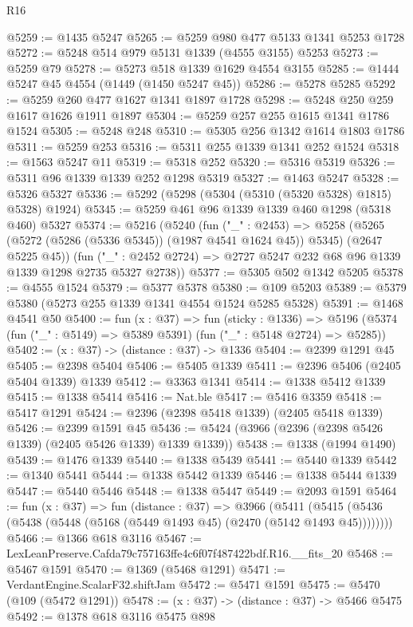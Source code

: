 \begin{lexlean}{R16}
\begin{coremodule}
@5259 := @1435 @5247
@5265 := @5259 @980 @477 @5133 @1341 @5253 @1728
@5272 := @5248 @514 @979 @5131 @1339 (@4555 @3155) @5253
@5273 := @5259 @79
@5278 := @5273 @518 @1339 @1629 @4554 @3155
@5285 := @1444 @5247 @45 @4554 (@1449 (@1450 @5247 @45))
@5286 := @5278 @5285
@5292 := @5259 @260 @477 @1627 @1341 @1897 @1728
@5298 := @5248 @250 @259 @1617 @1626 @1911 @1897
@5304 := @5259 @257 @255 @1615 @1341 @1786 @1524
@5305 := @5248 @248
@5310 := @5305 @256 @1342 @1614 @1803 @1786
@5311 := @5259 @253
@5316 := @5311 @255 @1339 @1341 @252 @1524
@5318 := @1563 @5247 @11
@5319 := @5318 @252
@5320 := @5316 @5319
@5326 := @5311 @96 @1339 @1339 @252 @1298 @5319
@5327 := @1463 @5247
@5328 := @5326 @5327
@5336 := @5292 (@5298 (@5304 (@5310 (@5320 @5328) @1815) @5328) @1924)
@5345 := @5259 @461 @96 @1339 @1339 @460 @1298 (@5318 @460) @5327
@5374 := @5216
    (@5240
      (fun ("_" : @2453) =>
      @5258 (@5265 (@5272 (@5286 (@5336 @5345)) (@1987 @4541 @1624 @45)) @5345) (@2647 @5225 @45))
      (fun ("_" : @2452 @2724) => @2727 @5247 @232 @68 @96 @1339 @1339 @1298 @2735 @5327 @2738))
@5377 := @5305 @502 @1342 @5205
@5378 := @4555 @1524
@5379 := @5377 @5378
@5380 := @109 @5203
@5389 := @5379 @5380 (@5273 @255 @1339 @1341 @4554 @1524 @5285 @5328)
@5391 := @1468 @4541 @50
@5400 := fun (x : @37) =>
  fun (sticky : @1336) =>
  @5196 (@5374 (fun ("_" : @5149) => @5389 @5391) (fun ("_" : @5148 @2724) => @5285))
@5402 := (x : @37) -> (distance : @37) -> @1336
@5404 := @2399 @1291 @45
@5405 := @2398 @5404
@5406 := @5405 @1339
@5411 := @2396 @5406 (@2405 @5404 @1339) @1339
@5412 := @3363 @1341
@5414 := @1338 @5412 @1339
@5415 := @1338 @5414
@5416 := Nat.ble
@5417 := @5416 @3359
@5418 := @5417 @1291
@5424 := @2396 (@2398 @5418 @1339) (@2405 @5418 @1339)
@5426 := @2399 @1591 @45
@5436 := @5424 (@3966 (@2396 (@2398 @5426 @1339) (@2405 @5426 @1339) @1339 @1339))
@5438 := @1338 (@1994 @1490)
@5439 := @1476 @1339
@5440 := @1338 @5439
@5441 := @5440 @1339
@5442 := @1340 @5441
@5444 := @1338 @5442 @1339
@5446 := @1338 @5444 @1339
@5447 := @5440 @5446
@5448 := @1338 @5447
@5449 := @2093 @1591
@5464 := fun (x : @37) =>
  fun (distance : @37) =>
  @3966 (@5411 (@5415 (@5436 (@5438 (@5448 (@5168 (@5449 @1493 @45) (@2470 (@5142 @1493 @45))))))))
@5466 := @1366 @618 @3116
@5467 := LexLeanPreserve.Cafda79c757163ffe4c6f07f487422bdf.R16.__fits_20
@5468 := @5467 @1591
@5470 := @1369 (@5468 @1291)
@5471 := VerdantEngine.ScalarF32.shiftJam
@5472 := @5471 @1591
@5475 := @5470 (@109 (@5472 @1291))
@5478 := (x : @37) -> (distance : @37) -> @5466 @5475
@5492 := @1378
    @618
    @3116
    @5475
    @898

\end{coremodule}
\end{lexlean}
